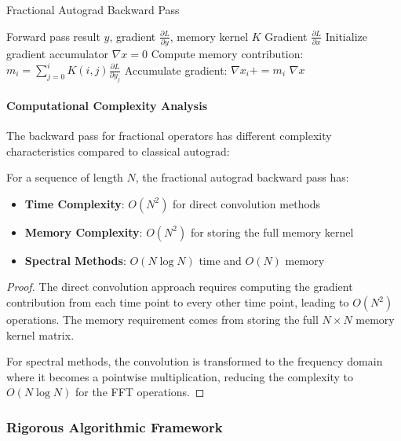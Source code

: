 \begin{algorithm}[h]
\caption{Fractional Autograd Backward Pass}
\begin{algorithmic}[1]
\Require Forward pass result $y$, gradient $\frac{\partial L}{\partial y}$, memory kernel $K$
\Ensure Gradient $\frac{\partial L}{\partial x}$
\State Initialize gradient accumulator $\nabla x = 0$
    \State Compute memory contribution: $m_i = \sum_{j=0}^{i} K(i,j) \frac{\partial L}{\partial y_j}$
    \State Accumulate gradient: $\nabla x_i += m_i$
\EndFor
\Return $\nabla x$
\end{algorithmic}
\end{algorithm}

\paragraph{Computational Complexity Analysis}

The backward pass for fractional operators has different complexity characteristics compared to classical autograd:

\begin{theorem}
For a sequence of length $N$, the fractional autograd backward pass has:
\begin{itemize}
\item \textbf{Time Complexity}: $O(N^2)$ for direct convolution methods
\item \textbf{Memory Complexity}: $O(N^2)$ for storing the full memory kernel
\item \textbf{Spectral Methods}: $O(N \log N)$ time and $O(N)$ memory
\end{itemize}
\end{theorem}

\begin{proof}
The direct convolution approach requires computing the gradient contribution from each time point to every other time point, leading to $O(N^2)$ operations. The memory requirement comes from storing the full $N \times N$ memory kernel matrix.

For spectral methods, the convolution is transformed to the frequency domain where it becomes a pointwise multiplication, reducing the complexity to $O(N \log N)$ for the FFT operations.
\end{proof}

\subsubsection{Rigorous Algorithmic Framework}

